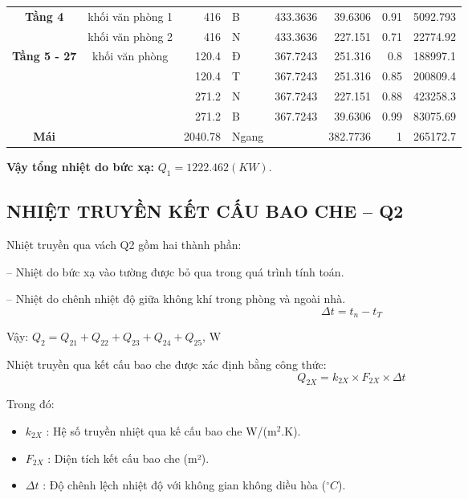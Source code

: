 \begin{table}[H]
\begin{adjustbox}{width=\textwidth}
\begin{tabular}{|c|r|r|l|r|r|r|r|}
		\hline
		\multirow{2}[4]{*}{\textbf{Tầng 4}} & \multicolumn{1}{l|}{khối văn phòng 1} & 416   & B     & 433.3636 & 39.6306 & 0.91  & 5092.793 \bigstrut\\
		\cline{2-8}          & \multicolumn{1}{l|}{khối văn phòng 2} & 416   & N     & 433.3636 & 227.151 & 0.71  & 22774.92 \bigstrut\\
		\hline
		\multirow{4}[8]{*}{\textbf{Tầng 5 - 27}} & \multicolumn{1}{c|}{\multirow{4}[8]{*}{khối văn phòng}} & 120.4 & Đ     & 367.7243 & 251.316 & 0.8   & 188997.1 \bigstrut\\
		\cline{3-8}          &       & 120.4 & T     & 367.7243 & 251.316 & 0.85  & 200809.4 \bigstrut\\
		\cline{3-8}          &       & 271.2 & N     & 367.7243 & 227.151 & 0.88  & 423258.3 \bigstrut\\
		\cline{3-8}          &       & 271.2 & B     & 367.7243 & 39.6306 & 0.99  & 83075.69 \bigstrut\\
		\hline
		\textbf{Mái} &       & 2040.78 & Ngang &       & 382.7736 & 1     & 265172.7 \bigstrut\\
		\hline
	\end{tabular}%
\end{adjustbox}
	\label{b:ndbxmt}%
\end{table}%

\textbf{Vậy tổng nhiệt do bức xạ:} $Q_{1} = 1222.462(KW)$.

\subsection{NHIỆT TRUYỀN KẾT CẤU BAO CHE -- Q{\scriptsize 2}}
Nhiệt truyền qua vách Q2 gồm hai thành phần:

-- Nhiệt do bức xạ vào tường được bỏ qua trong quá trình tính toán.

-- Nhiệt do chênh nhiệt độ giữa không khí trong phòng và ngoài nhà.
\begin{equation*}
	\Delta t = t_{n} - t_{T}
\end{equation*}

Vậy: $Q_{2} = Q_{21} + Q_{22} + Q_{23} + Q_{24} + Q_{25}$, W 

Nhiệt truyền qua kết cấu bao che được xác định bằng công thức:
\begin{equation*}
	Q_{2X} = k_{2X}\times F_{2X}\times\Delta t
\end{equation*}

Trong đó:
\begin{itemize}
	\item $k_{2X}$ : Hệ số truyền nhiệt qua kế cấu bao che W/(m$^2$.K).
	\item $F_{2X}$ : Diện tích kết cấu bao che (m²).
	\item $\Delta t$ : Độ chênh lệch nhiệt độ với không gian không diều hòa ($^{\circ}C$).
\end{itemize}

